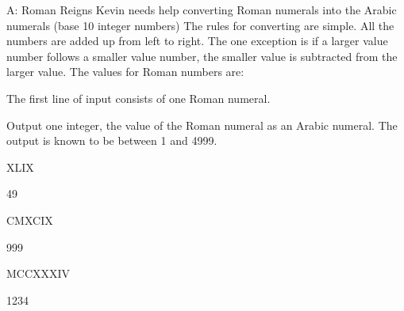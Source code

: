 \begin{problem}{A: Roman Reigns}
Kevin needs help converting Roman numerals into the Arabic numerals (base 10 integer numbers)
The rules for converting are simple. All the numbers are added up from left to right.
The one exception is if a larger value number follows a smaller value number, the smaller value is subtracted from the larger value.
The values for Roman numbers are:

\end{problem}

\begin{formalin}
The first line of input consists of one Roman numeral. 
\end{formalin}

\begin{formalout}
Output one integer, the value of the Roman numeral as an Arabic numeral.
The output is known to be between 1 and 4999.
\end{formalout}

\begin{datain}
XLIX
\end{datain}
\begin{dataout}
49
\end{dataout}

\begin{datain}
CMXCIX
\end{datain}
\begin{dataout}
999
\end{dataout}

\begin{datain}
MCCXXXIV
\end{datain}
\begin{dataout}
1234
\end{dataout}

